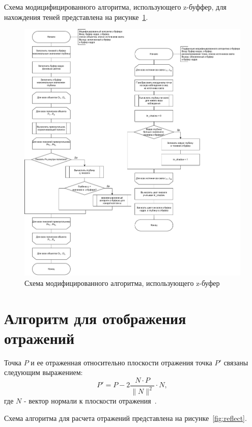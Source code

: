 Схема модицифицированного алгоритма, использующего z-буффер, для нахождения теней представлена на рисунке~\ref{fig:z_mod}.

\begin{figure}[h!]
	\centering
	\includegraphics[width=0.96\linewidth]{img/z_mod}
	\caption{Схема модифицированного алгоритма, использующего z-буфер}
	\label{fig:z_mod}
\end{figure}
\clearpage

\section{Алгоритм для отображения отражений}

Точка $P$ и ее отраженная относительно плоскости отражения точка $P'$ связаны следующим выражением: 
\begin{equation}
	\label{for:ref}
	P' = P - 2\frac{N \cdot P}{\|N\|^2} \cdot N,
\end{equation}
где $N$ - вектор нормали к плоскости отражения~\cite{refl}.

Схема алгоритма для расчета отражений представлена на рисунке~\ref{fig:reflect}.

